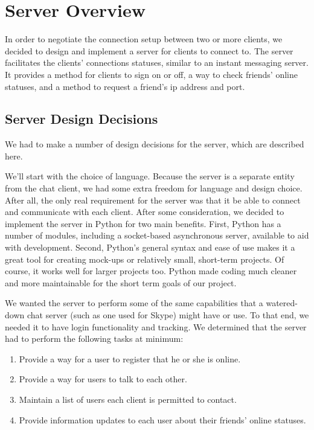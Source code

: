 
\section{Server Overview}

In order to negotiate the connection setup between two or more clients, we decided to
design and implement a server for clients to connect to. The server 
facilitates the clients' connections statuses, similar to an instant messaging server. It
provides a method for clients to sign on or off, a way to check friends' online
statuses, and a method to request a friend's ip address and port.

\subsection{Server Design Decisions}

We had to make a number of design decisions for the server, which are described here.

We'll start with the choice of language. Because the server is a separate entity from
the chat client, we had some extra freedom for language and design choice. After all,
the only real requirement for the server was that it be able to connect and communicate
with each client. After some consideration, we decided to implement the server in
Python for two main benefits. First, Python has a number of modules, including a 
socket-based asynchronous server, available to aid with development. Second, Python's
general syntax and ease of use makes it a great tool for creating mock-ups or
relatively small, short-term projects. Of course, it works well for larger projects too.
Python made coding much cleaner and more maintainable for the short term goals of our
project.

We wanted the server to perform some of the same capabilities that a watered-down chat
server (such as one used for Skype) might have or use. To that end, we needed it to
have login functionality and tracking. We determined that the server
had to perform the following tasks at minimum:

\begin{enumerate}
  \item Provide a way for a user to register that he or she is online.
  \item Provide a way for users to talk to each other.
  \item Maintain a list of users each client is permitted to contact.
  \item Provide information updates to each user about their friends' online statuses.
\end{enumerate}

